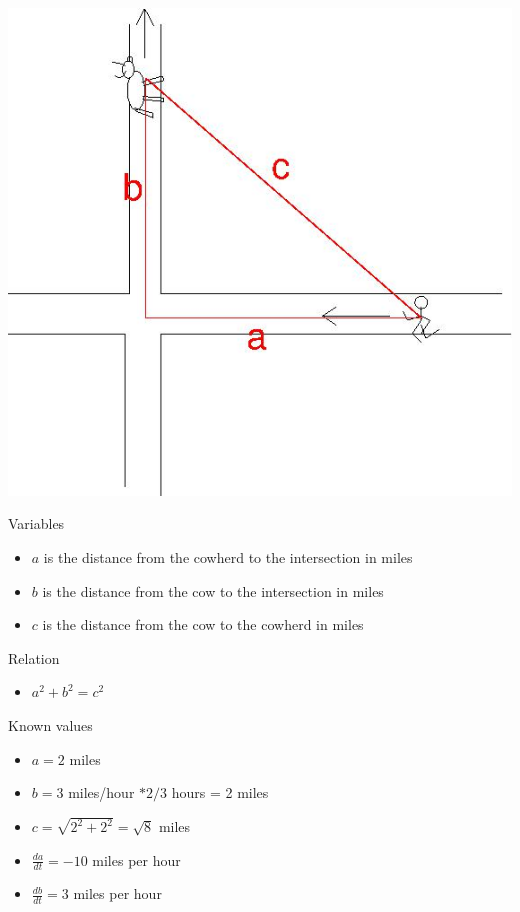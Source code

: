 \documentclass{ximera}
\begin{document}
\begin{exercise}
\begin{hint}
\begin{image}\includegraphics{rr-cow-labeled.jpg}\end{image}



Variables

\begin{itemize}
\item
  $a$ is the distance from the cowherd to the intersection in miles
\item
  $b$ is the distance from the cow to the intersection in miles
\item
  $c$ is the distance from the cow to the cowherd in miles
\end{itemize}

Relation

\begin{itemize}
\itemsep1pt\parskip0pt
\item
  $a^2+b^2 = c^2$
\end{itemize}

Known values

\begin{itemize}
\item
  $a = 2$ miles
\item
  $b = 3$ miles/hour $*2/3$ hours = 2 miles
\item
  $c = \sqrt{2^2+2^2} = \sqrt{8}$ miles
\item
  $\frac{da}{dt} = -10$ miles per hour
\item
  $\frac{db}{dt} = 3$ miles per hour
\end{itemize}


\end{hint}
\end{exercise}
\end{document}
